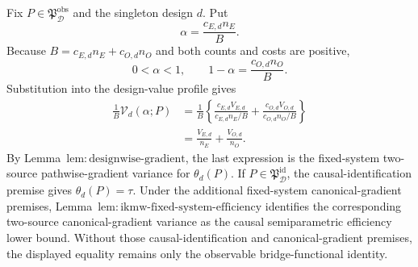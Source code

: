 Fix \(P\in\mathfrak P_{\mathcal D}^{\mathrm{obs}}\) and the singleton design \(d\).  Put
\[
 \alpha=\frac{c_{E,d}n_E}{B}.
\]
Because \(B=c_{E,d}n_E+c_{O,d}n_O\) and both counts and costs are positive,
\[
 0<\alpha<1,
 \qquad
 1-\alpha=\frac{c_{O,d}n_O}{B}.
\]
Substitution into the design-value profile gives
\[
\begin{aligned}
 \frac1B\mathcal V_d(\alpha;P)
 &=\frac1B\left\{
 \frac{c_{E,d}V_{E,d}}{c_{E,d}n_E/B}
 +\frac{c_{O,d}V_{O,d}}{c_{O,d}n_O/B}\right\}\\
 &=\frac{V_{E,d}}{n_E}+\frac{V_{O,d}}{n_O}.
\end{aligned}
\]
By Lemma~\(\mathrm{lem{:}designwise\text{-}gradient}\), the last expression is the fixed-system two-source pathwise-gradient variance for \(\theta_d(P)\).  If \(P\in\mathfrak P_{\mathcal D}^{\mathrm{id}}\), the causal-identification premise gives \(\theta_d(P)=\tau\).  Under the additional fixed-system canonical-gradient premises, Lemma~\(\mathrm{lem{:}ikmw\text{-}fixed\text{-}system\text{-}efficiency}\) identifies the corresponding two-source canonical-gradient variance as the causal semiparametric efficiency lower bound.  Without those causal-identification and canonical-gradient premises, the displayed equality remains only the observable bridge-functional identity.